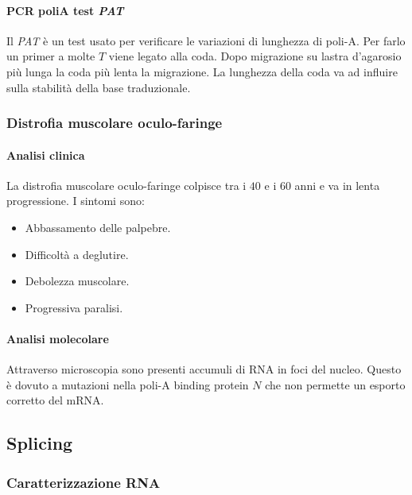 			\paragraph{PCR poliA test \emph{PAT}}
			Il \emph{PAT} \`e un test usato per verificare le variazioni di lunghezza di poli-A.
			Per farlo un primer a molte $T$ viene legato alla coda.
			Dopo migrazione su lastra d'agarosio pi\`u lunga la coda pi\`u lenta la migrazione.
			La lunghezza della coda va ad influire sulla stabilit\`a della base traduzionale.

		\subsubsection{Distrofia muscolare oculo-faringe}
	
			\paragraph{Analisi clinica}
			La distrofia muscolare oculo-faringe colpisce tra i $40$ e i $60$ anni e va in lenta progressione.
			I sintomi sono:
			\begin{multicols}{2}
				\begin{itemize}
					\item Abbassamento delle palpebre.
					\item Difficolt\`a a deglutire.
					\item Debolezza muscolare.
					\item Progressiva paralisi.
				\end{itemize}
			\end{multicols}

			\paragraph{Analisi molecolare}
			Attraverso microscopia sono presenti accumuli di RNA in foci del nucleo.
			Questo \`e dovuto a mutazioni nella poli-A binding protein $N$ che non permette un esporto corretto del mRNA.

		
	\subsection{Splicing}

		\subsubsection{Caratterizzazione RNA}

